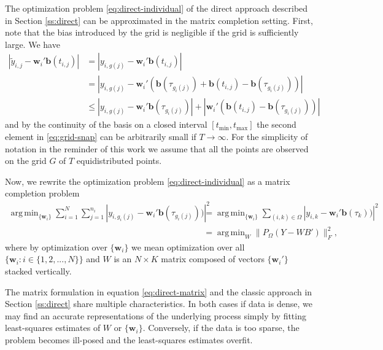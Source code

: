 \documentclass[preprint]{imsart}
\numberwithin{equation}{section}
\theoremstyle{plain}
\newcommand{\bb}{\mathbf{b}}
\newcommand{\bw}{\mathbf{w}}
\DeclareMathOperator*{\argmin}{arg\,min}
\begin{document}
The optimization problem \eqref{eq:direct-individual} of the direct approach described in Section \ref{ss:direct} can be approximated in the matrix completion setting. First, note that the bias introduced by the grid is negligible if the grid is sufficiently large. We have
\begin{align}
  \left|\tilde y_{i,j} - \bw_i'\bb(t_{i,j})\right| &= \left|y_{i,g(j)} - \bw_i'\bb(t_{i,j})\right|\nonumber\\
  &= \left| y_{i,g(j)} - \bw_i' (\bb (\tau_{g_i(j)}) + \bb (t_{i,j}) - \bb (\tau_{g_i(j)}))\right|\nonumber\\
  &\leq \left| y_{i,g(j)} - \bw_i' \bb(\tau_{g_i(j)})\right| + \left|\bw_i' (\bb(t_{i,j}) - \bb(\tau_{g_i(j)}))\right|\label{eq:grid-snap}
\end{align}
and by the continuity of the basis on a closed interval $[t_{\min},t_{\max}]$ the second element in \eqref{eq:grid-snap} can be arbitrarily small if $T \rightarrow \infty$. For the simplicity of notation in the reminder of this work we assume that all the points are observed on the grid $G$ of $T$ equidistributed points. 

Now, we rewrite the optimization problem \eqref{eq:direct-individual} as a matrix completion problem
\begin{align}
 \argmin_{\{\bw_i\}}\sum_{i=1}^N \sum_{j=1}^{n_i}\left|y_{i,g_i(j)} - \bw_i' \bb(\tau_{g_i(j)}))\right|^2 &= \argmin_{\{\bw_i\}}\sum_{(i,k) \in \Omega}\left|y_{i,k} - \bw_i' \bb(\tau_{k}))\right|^2\nonumber\\
&= \argmin_W \| P_\Omega(Y - WB') \|_F^2,\label{eq:direct-matrix}
\end{align}
where by optimization over $\{\bw_i\}$ we mean optimization over all $\{\bw_i : i \in \{ 1,2,...,N \}\}$ and $W$ is an $N \times K$ matrix composed of vectors $\{\bw_i'\}$ stacked vertically.

The matrix formulation in equation \eqref{eq:direct-matrix} and the classic approach in Section \ref{ss:direct} share multiple characteristics. In both cases if data is dense, we may find an accurate representations of the underlying process simply by fitting least-squares estimates of $W$ or $\{\bw_i\}$. Conversely, if the data is too sparse, the problem becomes ill-posed and the least-squares estimates overfit. %
\end{document}
